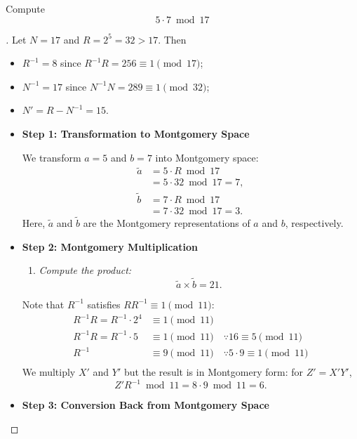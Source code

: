 \begin{example}
Compute \[
5\cdot 7\bmod{17}
\] \begin{proof}[\sol]
Let $N=17$ and $R=2^5=32>17$. Then \begin{itemize}
	\item $R^{-1}=8$ since $R^{-1}R=256\equiv 1\pmod{17}$;
	\item $N^{-1}=17$ since $N^{-1}N=289\equiv 1\pmod{32}$;
	\item $N'=R-N^{-1}=15$.
\end{itemize} 
\begin{itemize}
\item[] \textbf{Step 1: Transformation to Montgomery Space}

We transform $a=5$ and $b=7$ into Montgomery space: \begin{align*}
\tilde{a}&=5\cdot R\bmod 17\\
&=5\cdot32\bmod 17 = 7, \\
\tilde{b}&=7\cdot R\bmod 17\\
&=7\cdot32\bmod 17 = 3.
\end{align*} Here, $\tilde{a}$ and $\tilde{b}$ are the Montgomery representations of $a$ and $b$, respectively.
\item[] \textbf{Step 2: Montgomery Multiplication}

\begin{enumerate}
	\item \textit{Compute the product:} \[
	\tilde{a}\times\tilde{b}=21.
	\]
\end{enumerate}

Note that $R^{-1}$ satisfies $RR^{-1}\equiv 1\pmod{11}$: \begin{align*}
	R^{-1}R=R^{-1}\cdot 2^4&\equiv 1\pmod{11} \\
	R^{-1}R=R^{-1}\cdot 5&\equiv 1\pmod{11}\quad\because 16\equiv 5\pmod{11} \\
	R^{-1}&\equiv 9\pmod{11}\quad\because 5\cdot 9\equiv 1\pmod{11} \\
\end{align*} 
We multiply $X'$ and $Y'$ but the result is in Montgomery form: for $Z'=X'Y'$, \[
Z'R^{-1}\bmod 11 = 8\cdot 9\bmod 11 = 6.
\]
\item[] \textbf{Step 3: Conversion Back from Montgomery Space}
\end{itemize}
\end{proof}
\end{example}
\vspace{8pt}
